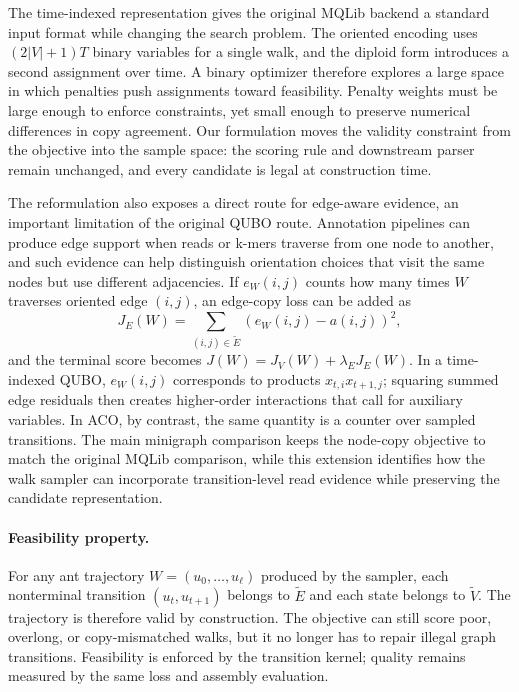 \documentclass[11pt]{article}
\newcommand{\Vori}{\widetilde V}
\newcommand{\Eori}{\widetilde E}
\begin{document}
The time-indexed representation gives the original MQLib backend \citep{dunning2018mqlib} a standard input format while changing the search problem. The oriented encoding uses $(2|V|+1)T$ binary variables for a single walk, and the diploid form introduces a second assignment over time. A binary optimizer therefore explores a large space in which penalties push assignments toward feasibility. Penalty weights must be large enough to enforce constraints, yet small enough to preserve numerical differences in copy agreement. Our formulation moves the validity constraint from the objective into the sample space: the scoring rule and downstream parser remain unchanged, and every candidate is legal at construction time.

The reformulation also exposes a direct route for edge-aware evidence, an important limitation of the original QUBO route. Annotation pipelines can produce edge support when reads or k-mers traverse from one node to another, and such evidence can help distinguish orientation choices that visit the same nodes but use different adjacencies. If $e_W(i,j)$ counts how many times $W$ traverses oriented edge $(i,j)$, an edge-copy loss can be added as
\begin{equation}
J_E(W)=\sum_{(i,j)\in \Eori}\left(e_W(i,j)-a(i,j)\right)^2,
\label{eq:edge-objective}
\end{equation}
and the terminal score becomes $J(W)=J_V(W)+\lambda_EJ_E(W)$. In a time-indexed QUBO, $e_W(i,j)$ corresponds to products $x_{t,i}x_{t+1,j}$; squaring summed edge residuals then creates higher-order interactions that call for auxiliary variables. In ACO, by contrast, the same quantity is a counter over sampled transitions. The main minigraph comparison keeps the node-copy objective to match the original MQLib comparison, while this extension identifies how the walk sampler can incorporate transition-level read evidence while preserving the candidate representation.

\paragraph{Feasibility property.}
For any ant trajectory $W=(u_0,\ldots,u_\ell)$ produced by the sampler, each nonterminal transition $(u_t,u_{t+1})$ belongs to $\Eori$ and each state belongs to $\Vori$. The trajectory is therefore valid by construction. The objective can still score poor, overlong, or copy-mismatched walks, but it no longer has to repair illegal graph transitions. Feasibility is enforced by the transition kernel; quality remains measured by the same loss and assembly evaluation.
\end{document}
